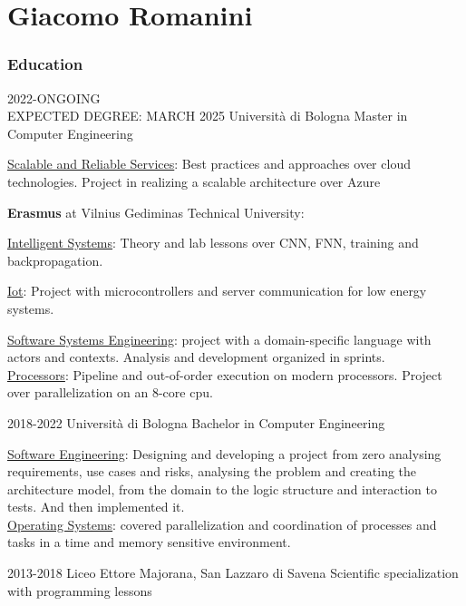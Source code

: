 \documentclass{tccv}
\begin{document}
\part{Giacomo Romanini}


\section{Education}

\hfill

\begin{eventlist}

      \item{2022-ONGOING\\EXPECTED DEGREE: MARCH 2025}
            {Università di Bologna}
            {Master in Computer Engineering}

      \underline{Scalable and Reliable Services}: Best practices and approaches over cloud technologies. Project in realizing a scalable architecture over Azure

      \textbf{Erasmus} at Vilnius Gediminas Technical University:

      \quad \underline{Intelligent Systems}: Theory and lab lessons over CNN, FNN, training and backpropagation.

      \quad \underline{Iot}: Project with microcontrollers and server communication for low energy systems.

      \underline{Software Systems Engineering}: project with a domain-specific language with actors and contexts. Analysis and development organized in sprints.\\
      \underline{Processors}: Pipeline and out-of-order execution on modern processors. Project over parallelization on an 8-core cpu.

      \item{2018-2022}
            {Università di Bologna}
            {Bachelor in Computer Engineering}

      \underline{Software Engineering}: Designing and developing a project from zero analysing requirements, use cases and risks, analysing the problem and creating the architecture model, from the domain to the logic structure and interaction to tests. And then implemented it.\\
      \underline{Operating Systems}: covered parallelization and coordination of processes and tasks in a time and memory sensitive environment.

      \item{2013-2018}
            {Liceo Ettore Majorana, San Lazzaro di Savena}
            {Scientific specialization with programming lessons}
\end{eventlist}
\end{document}
